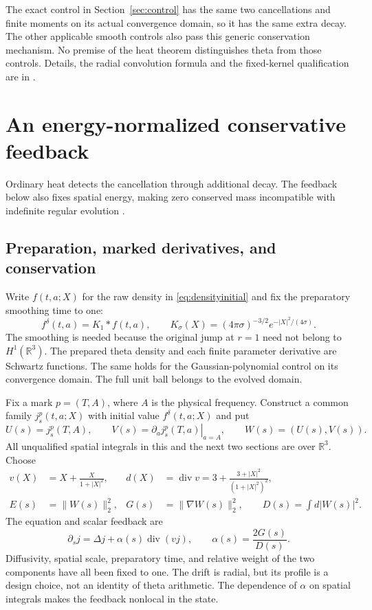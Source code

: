 \documentclass[11pt]{article}
\numberwithin{equation}{section}
\newcommand{\R}{\mathbb R}
\begin{document}
The exact control in Section~\ref{sec:control} has the same two cancellations and finite
moments on its actual convergence domain, so it has the same extra
decay. The other applicable smooth controls also pass this generic
conservation mechanism. No premise of the heat theorem distinguishes
theta from those controls. Details, the radial convolution formula and
the fixed-kernel qualification are in \cite{ConservativeNote}.

\section{An energy-normalized conservative feedback}\label{sec:feedback}

Ordinary heat detects the cancellation through additional decay.
The feedback below also fixes spatial energy, making zero conserved
mass incompatible with indefinite regular evolution \cite{FeedbackNote}.

\subsection{Preparation, marked derivatives, and conservation}

Write $f(t,a;X)$ for the raw density in \eqref{eq:densityinitial} and
fix the preparatory smoothing time to one:
\[
 f^\delta(t,a)=K_1*f(t,a),\qquad
 K_\sigma(X)=(4\pi\sigma)^{-3/2}e^{-|X|^2/(4\sigma)}.
\]
The smoothing is needed because the original jump at $r=1$ need not
belong to $H^1(\R^3)$. The prepared theta density and each finite
parameter derivative are Schwartz functions. The same holds for the
Gaussian-polynomial control on its convergence domain. The full unit
ball belongs to the evolved domain.

Fix a mark $p=(T,A)$, where $A$ is the physical frequency. Construct a common family
$j_s^p(t,a;X)$ with initial value $f^\delta(t,a;X)$ and put
\begin{equation}\label{eq:feedbackpair}
 U(s)=j_s^p(T,A),\qquad
 V(s)=\left.\partial_a j_s^p(T,a)\right|_{a=A},\qquad W(s)=(U(s),V(s)).
\end{equation}
All unqualified spatial integrals in this and the next two sections
are over $\R^3$. Choose
\begin{align}
 v(X)&=X+\frac{X}{1+|X|^2},&
 d(X)&=\operatorname{div}v
       =3+\frac{3+|X|^2}{(1+|X|^2)^2},\label{eq:feedbackdrift}\\
 E(s)&=\|W(s)\|_2^2,&G(s)&=\|\nabla W(s)\|_2^2,\qquad
 D(s)=\int d|W(s)|^2.
\end{align}
The equation and scalar feedback are
\begin{equation}\label{eq:feedbackpde}
 \boxed{\partial_sj=\Delta j+\alpha(s)\operatorname{div}(vj),
 \qquad \alpha(s)=\frac{2G(s)}{D(s)}.}
\end{equation}
Diffusivity, spatial scale, preparatory time, and relative weight of
the two components have all been fixed to one. The drift is radial,
but its profile is a design choice, not an identity of theta arithmetic.
The dependence of $\alpha$ on spatial integrals makes the feedback
nonlocal in the state.
\end{document}
